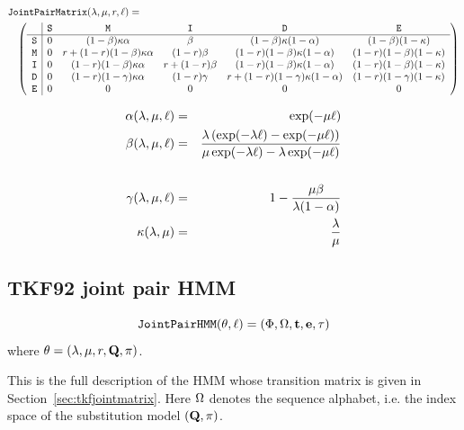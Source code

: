 \documentclass{article}
\newcommand\seclabel[1]{\label{sec:#1}}
\newcommand\secref[1]{Section~\ref{sec:#1}}
\begin{document}
\begin{eqnarray*}
\lefteqn{\jointpairmatrix(\insrate,\delrate,\fragext,\ell) = } & & \\
& & \left( \begin{array}{r|ccccc}
   & \sta & \mat & \ins & \del & \fin \\
\hline
\sta & 0 & (1-\beta)\kappa\alpha & \beta & (1-\beta)\kappa(1-\alpha) & (1-\beta)(1-\kappa) \\
\mat & 0 & \fragext + (1-\fragext)(1-\beta)\kappa\alpha & (1-\fragext)\beta & (1-\fragext)(1-\beta)\kappa(1-\alpha) & (1-\fragext)(1-\beta)(1-\kappa) \\
\ins & 0 & (1-\fragext)(1-\beta)\kappa\alpha & \fragext + (1-\fragext)\beta & (1-\fragext)(1-\beta)\kappa(1-\alpha) & (1-\fragext)(1-\beta)(1-\kappa) \\
\del & 0 & (1-\fragext)(1-\gamma)\kappa\alpha & (1-\fragext)\gamma & \fragext + (1-\fragext)(1-\gamma)\kappa(1-\alpha) & (1-\fragext)(1-\gamma)(1-\kappa) \\
\fin & 0 & 0 & 0 & 0 & 0
   \end{array} \right)
\end{eqnarray*}


\begin{eqnarray*}
    \alpha(\lambda,\mu,\ell) & = &
        \exp (-\mu \ell) \\
    \beta(\lambda,\mu,\ell) & = &
        \frac{\lambda \left( \exp (-\lambda \ell) - \exp (-\mu \ell) \right)}
        {\mu \exp (-\lambda \ell) - \lambda \exp (-\mu \ell)} \\
    \\
    \gamma(\lambda,\mu,\ell) & = &
        1 - \frac{\mu \beta}{\lambda (1- \alpha)}
    \\
    \kappa(\lambda,\mu) & = & \frac{\lambda}{\mu}
\end{eqnarray*}

\subsection{TKF92 joint pair HMM}
\seclabel{tkfjoint}

\[
{\tt JointPairHMM}(\theta,\ell) = (\Phi,\Omega,{\bf t},{\bf e},\tau)
\]
where $\theta = (\lambda,\mu,r,{\bf Q},\pi)$.

This is the full description of the HMM whose transition matrix
is given in \secref{tkfjointmatrix}.
Here $\Omega$ denotes the sequence alphabet, i.e. the index space of the substitution model $({\bf Q},\pi)$.
\end{document}
